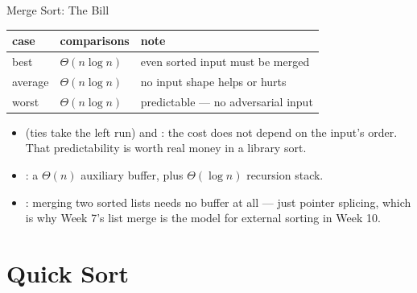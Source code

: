 \documentclass[aspectratio=169]{beamer}
\begin{document}
\begin{frame}{Merge Sort: The Bill}
  \begin{center}
  {\footnotesize
  \begin{tabular}{lll}
    \toprule
    \textbf{case} & \textbf{comparisons} & \textbf{note} \\
    \midrule
    best & $\Theta(n\log n)$ & even sorted input must be merged \\
    average & $\Theta(n\log n)$ & no input shape helps or hurts \\
    worst & $\Theta(n\log n)$ & predictable --- no adversarial input \\
    \bottomrule
  \end{tabular}}
  \end{center}
  \begin{itemize}
    \item {} (ties take the left run) and : the
      cost does not depend on the input's order. That predictability is worth
      real money in a library sort.
    \item {}: a $\Theta(n)$ auxiliary buffer, plus
      $\Theta(\log n)$ recursion stack.
    \item {}: merging two sorted lists
      needs no buffer at all --- just pointer splicing, which is why Week 7's
      list merge is the model for external sorting in Week 10.
  \end{itemize}
\end{frame}


\section{Quick Sort}

\end{document}
